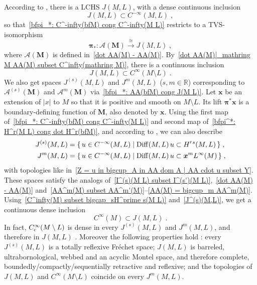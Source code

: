 \documentclass{memo-l}
\theoremstyle{plain}
\theoremstyle{definition}
\theoremstyle{remark}
\newcommand{\R}{\mathbb{R}}
\renewcommand{\AA}{\mathcal{A}}
\newcommand{\bfx}{\boldsymbol{x}}
\newcommand{\bfM}{\boldsymbol{M}}
\newcommand{\bfpi}{\boldsymbol{\pi}}
\newcommand{\Diff}{\operatorname{Diff}}
\newcommand{\Cinftyc}{C^\infty_{\text{\rm c}}}
\numberwithin{section}{chapter}
\numberwithin{equation}{section}%
\begin{document}
According to , there is a LCHS $J(M,L)$, with a dense continuous inclusion
\begin{equation}\label{J^(infty)(M L) subset C^-infty(M L}
J(M,L)\subset C^{-\infty}(M,L)\;,
\end{equation}
so that~\eqref{bfpi_*: C^-infty(bfM) cong C^-infty(M L)} restricts to a TVS-isomorphism 
\begin{equation}\label{bfpi_*: AA(bfM) cong J(M L)}
\bfpi_*:\AA(\bfM)\xrightarrow{\cong}J(M,L)\;,
\end{equation}
where $\AA(\bfM)$ is defined in~\eqref{dot AA(M) - AA(M)}. By~\eqref{dot AA(M)|_mathring M AA(M) subset C^infty(mathring M)}, there is a continuous inclusion
\[
J(M,L)\subset C^\infty(M\setminus L)\;.
\]
We also get spaces $J^{(s)}(M,L)$  and $J^m(M,L)$  ($s,m\in\R$) corresponding to $\AA^{(s)}(\bfM)$ and $\AA^m(\bfM)$ via~\eqref{bfpi_*: AA(bfM) cong J(M L)}. Let $\bfx$ be an extension of $|x|$ to $M$ so that it is positive and smooth on $M\setminus L$. Its lift $\bfpi^*\bfx$ is a boundary-defining function of $\bfM$, also denoted by $\bfx$. Using the first map of~\eqref{bfpi_*: C^-infty(bfM) cong C^-infty(M L)} and second map of~\eqref{bfpi^*: H^r(M L) cong dot H^r(bfM)}, and according to , we can also describe
\begin{align}
J^{(s)}(M,L)&=\{\,u\in C^{-\infty}(M,L)\mid\Diff(M,L)\,u\subset H^{\prime\,s}(M,L)\,\}\;,\label{J^(s)(M,L)}\\
J^m(M,L)&=\{\,u\in C^{-\infty}(M,L)\mid\Diff(M,L)\,u\subset\bfx^mL^\infty(M)\,\}\;,\notag
\end{align}
with topologies like in~\eqref{Z = u in bigcup_A in AA dom A | AA cdot u subset Y}. These spaces satisfy the analogs of~\eqref{I^(s)(M L) subset I^(s')(M L)},~\eqref{dot AA(M) - AA(M)} and~\eqref{AA^m(M) subset AA^m'(M)}--\eqref{AA(M) = bigcup_m AA^m(M)}. Using~\eqref{C^infty(M) subset bigcap_sH^prime s(M L)} and~\eqref{J^(s)(M,L)}, we get a continuous dense inclusion \cite[Corollary~7.14]{AlvKordyLeichtnam-conormal}
\begin{equation}\label{C^infty(M) subset J^(infty)(M L)}
C^\infty(M)\subset J(M,L)\;.
\end{equation}
In fact, $\Cinftyc(M\setminus L)$ is dense in every $J^{(s)}(M,L)$ and $J^m(M,L)$, and therefore in $J(M,L)$ \cite[Corollaries~7.14 and~7.17 and the analog of Remark~6.41 for $J(M,L)$]{AlvKordyLeichtnam-conormal}. Moreover the following properties hold \cite[Corollaries~7.11--7.13 and~7.15]{AlvKordyLeichtnam-conormal}: every $J^{(s)}(M, L)$ is a totally reflexive Fr\'echet space; $J(M,L)$ is barreled, ultrabornological, webbed and an acyclic Montel space, and therefore complete, boundedly/compactly/sequentially retractive and reflexive; and the topologies of $J(M,L)$ and $C^\infty(M\setminus L)$ coincide on every $J^m(M,L)$.
\end{document}
